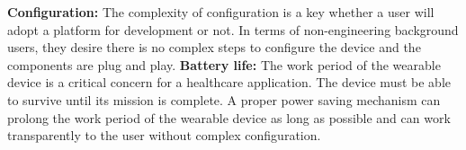 \vspace{10pt}
\newline
\textbf{Configuration:}\newline
The complexity of configuration is a key whether a user will adopt a platform for development or not. In terms of non-engineering background users, they desire there is no complex steps to configure the device and the components are plug and play.
\vspace{10pt}
\newline
\textbf{Battery life:}\newline
The work period of the wearable device is a critical concern for a healthcare application. The device must be able to survive until its mission is complete. A proper power saving mechanism can prolong the work period of the wearable device as long as possible and can work transparently to the user without complex configuration.

